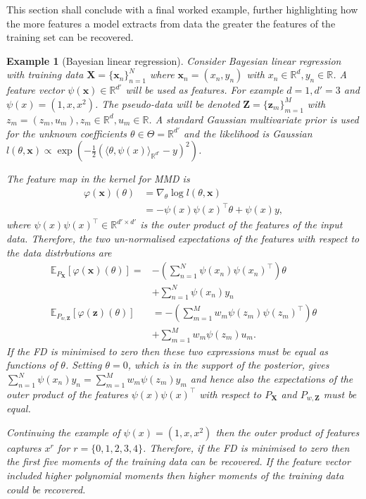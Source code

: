 \documentclass[hyperref]{article}
\theoremstyle{plain}
\newtheorem{example}{Example}[section]
\theoremstyle{remark}
\newcommand{\bx}{\mathbf{x}}
\newcommand{\bz}{\mathbf{z}}
\newcommand{\bX}{\mathbf{X}}
\newcommand{\bZ}{\mathbf{Z}}
\newcommand{\bbR}{\mathbb{R}}
\newcommand{\bbE}{\mathbb{E}}
\begin{document}
This section shall conclude with a final worked example, further highlighting how the more features a model extracts from data the greater the features of the training set can be recovered.

\begin{example}[Bayesian linear regression]\label{exp:BLR}
	Consider Bayesian linear regression with training data $\bX = \{\bx_{n}\}_{n=1}^{N}$ where $\bx_{n} = (x_{n},y_{n})$ with $x_{n}\in\bbR^{d}, y_{n}\in\bbR$. A feature vector $\psi(\bx)\in\bbR^{d'}$ will be used as features. For example $d=1,d'=3$ and $\psi(x) = (1,x,x^{2})$. The pseudo-data will be denoted $\bZ = \{\bz_{m}\}_{m=1}^{M}$ with $z_{m} = (z_{m},u_{m}), z_{m}\in\bbR^{d},u_{m}\in\bbR$. A standard Gaussian multivariate prior is used for the unknown coefficients $\theta\in\Theta = \bbR^{d'}$ and the likelihood is Gaussian $l(\theta,\bx) \propto\exp(-\frac{1}{2}( \langle\theta,\psi(x)\rangle_{\bbR^{d'}} - y)^{2})$. 
	
	The feature map in the kernel for MMD is 
	\begin{align*}
		\varphi(\bx)(\theta) & = \nabla_{\theta}\log l(\theta,\bx)  \\
		& = -\psi(x)\psi(x)^{\top}\theta + \psi(x)y,
	\end{align*}
where $\psi(x)\psi(x)^{\top}\in\bbR^{d'\times d'}$ is the outer product of the features of the input data. Therefore, the two un-normalised expectations of the features with respect to the data distrbutions are
\begin{align*}
	\bbE_{P_{\bX}}[\varphi(\bx)(\theta)]  = & -\left(\sum_{n=1}^{N}\psi(x_{n})\psi(x_{n})^{\top}\right)\theta \\
	& + \sum_{n=1}^{N}\psi(x_{n})y_{n} \\
	\bbE_{P_{w,\bZ}}[\varphi(\bz)(\theta)] & = -\left(\sum_{m=1}^{M}w_{m}\psi(z_{m})\psi(z_{m})^{\top}\right)\theta \\
	& + \sum_{m=1}^{M}w_{m}\psi(z_{m})u_{m}.
\end{align*} 
If the FD is minimised to zero then these two expressions must be equal as functions of $\theta$. Setting $\theta = 0$, which is in the support of the posterior, gives $\sum_{n=1}^{N}\psi(x_{n})y_{n} = \sum_{m=1}^{M}w_{m}\psi(z_{m})y_{m}$ and hence also the expectations of the outer product of the features $\psi(x)\psi(x)^{\top}$ with respect to $P_{\bX}$ and $P_{w,\bZ}$ must be equal. 

Continuing the example of $\psi(x) = (1,x,x^{2})$ then the outer product of features captures $x^{r}$ for $r = \{0,1,2,3,4\}$. Therefore, if the FD is minimised to zero then the first five moments of the training data can be recovered. If the feature vector included higher polynomial moments then higher moments of the training data could be recovered. 
\end{example}
\end{document}
